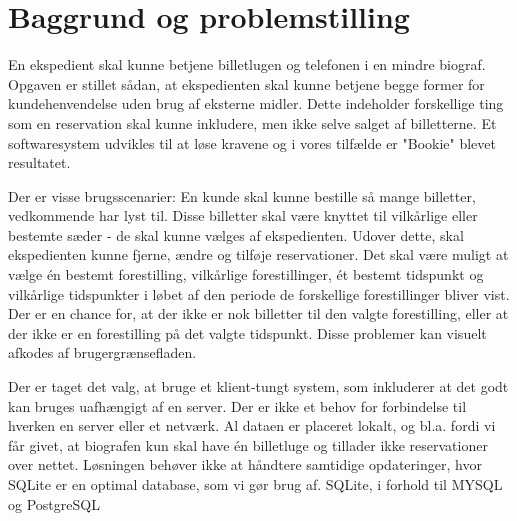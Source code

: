 \chapter{Baggrund og problemstilling}

En ekspedient skal kunne betjene billetlugen og telefonen i en mindre biograf. Opgaven er stillet sådan, at ekspedienten skal kunne betjene begge former for kundehenvendelse uden brug af eksterne midler. Dette indeholder forskellige ting som en reservation skal kunne inkludere, men ikke selve salget af billetterne. Et softwaresystem udvikles til at løse kravene og i vores tilfælde er "Bookie" blevet resultatet.


Der er visse brugsscenarier: En kunde skal kunne bestille så mange billetter, vedkommende har lyst til. Disse billetter skal være knyttet til vilkårlige eller bestemte sæder - de skal kunne vælges af ekspedienten. Udover dette, skal ekspedienten kunne fjerne, ændre og tilføje reservationer. Det skal være muligt at vælge én bestemt forestilling, vilkårlige forestillinger, ét bestemt tidspunkt og vilkårlige tidspunkter i løbet af den periode de forskellige forestillinger bliver vist.
Der er en chance for, at der ikke er nok billetter til den valgte forestilling, eller at der ikke er en forestilling på det valgte tidspunkt. Disse problemer kan visuelt afkodes af brugergrænsefladen.


Der er taget det valg, at bruge et klient-tungt system, som inkluderer at det godt kan bruges uafhængigt af en server. Der er ikke et behov for forbindelse til hverken en server eller et netværk. Al dataen er placeret lokalt, og  bl.a. fordi vi får givet, at biografen kun skal have én billetluge og tillader ikke reservationer over nettet. Løsningen behøver ikke at håndtere samtidige opdateringer, hvor SQLite er en optimal database, som vi gør brug af. SQLite, i forhold til MYSQL og PostgreSQL




